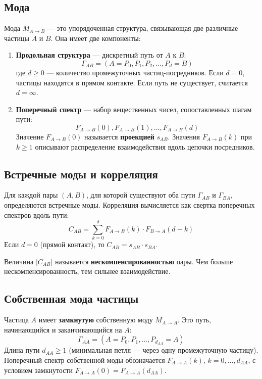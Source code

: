 \documentclass[a4paper,12pt]{article}
\begin{document}
\subsection{Мода}
Мода \(M_{A \to B}\) — это упорядоченная структура, связывающая две различные частицы \(A\) и \(B\). Она имеет две компоненты:
\begin{enumerate}
    \item \textbf{Продольная структура} — дискретный путь от \(A\) к \(B\):
    \[
    \Gamma_{AB} = (A = P_0, P_1, P_2, \dots, P_d = B)
    \]
    где \(d \ge 0\) — количество промежуточных частиц-посредников. Если \(d = 0\), частицы находятся в прямом контакте. Если путь не существует, считается \(d = \infty\).
    \item \textbf{Поперечный спектр} — набор вещественных чисел, сопоставленных шагам пути:
    \[
    F_{A\to B}(0), F_{A\to B}(1), \dots, F_{A\to B}(d)
    \]
    Значение \(F_{A\to B}(0)\) называется \textbf{проекцией} \(s_{AB}\). Значения \(F_{A\to B}(k)\) при \(k \ge 1\) описывают распределение взаимодействия вдоль цепочки посредников.
\end{enumerate}

\subsection{Встречные моды и корреляция}
Для каждой пары \((A, B)\), для которой существуют оба пути \(\Gamma_{AB}\) и \(\Gamma_{BA}\), определяются встречные моды. Корреляция вычисляется как свертка поперечных спектров вдоль пути:
\[
C_{AB} = \sum_{k=0}^{d} F_{A\to B}(k) \cdot F_{B\to A}(d-k)
\]
Если \(d = 0\) (прямой контакт), то \(C_{AB} = s_{AB} \cdot s_{BA}\).

Величина \(|C_{AB}|\) называется \textbf{нескомпенсированностью} пары. Чем больше нескомпенсированность, тем сильнее взаимодействие.

\subsection{Собственная мода частицы}
Частица \(A\) имеет \textbf{замкнутую} собственную моду \(M_{A\to A}\). Это путь, начинающийся и заканчивающийся на \(A\):
\[
\Gamma_{AA} = (A = P_0, P_1, \dots, P_{d_{AA}} = A)
\]
Длина пути \(d_{AA} \ge 1\) (минимальная петля — через одну промежуточную частицу). Поперечный спектр собственной моды обозначается \(F_{A\to A}(k)\), \(k = 0, \dots, d_{AA}\), с условием замкнутости \(F_{A\to A}(0) = F_{A\to A}(d_{AA})\).
\end{document}
